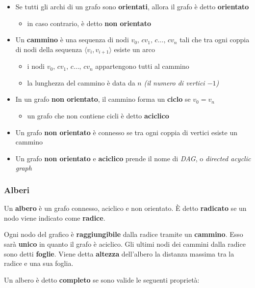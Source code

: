 \documentclass[italian, 10pt]{article}
\begin{document}
\begin{itemize}
  \item Se tutti gli archi di un grafo sono \textbf{orientati}, allora il grafo è detto \textbf{orientato}
        \begin{itemize}
          \item in caso contrario, è detto \textbf{non orientato}
        \end{itemize}
  \item Un \textbf{cammino} è una sequenza di nodi \(v_0,\,c v_1,\,c \ldots,\,c v_n\) tali che tra ogni coppia di nodi della sequenza \(\langle v_i, v_{i+1} \rangle\) esiste un arco
        \begin{itemize}
          \item i nodi \(v_0,\,c v_1,\,c \ldots,\,c v_n\) appartengono tutti al cammino
          \item la lunghezza del cammino è data da \(n\) \textit{(il numero di vertici \(-1\))}
        \end{itemize}
  \item In un grafo \textbf{non orientato}, il cammino forma un \textbf{ciclo} se \(v_0 = v_n\)
        \begin{itemize}
          \item un grafo che non contiene cicli è detto \textbf{aciclico}
        \end{itemize}
  \item Un grafo \textbf{non orientato} è connesso se tra ogni coppia di vertici esiste un cammino
  \item Un grafo \textbf{non orientato} e \textbf{aciclico} prende il nome di \textit{DAG}, o \textit{directed acyclic graph}
\end{itemize}

\subsubsection{Alberi}
\label{sec:alberi}

Un \textbf{albero} è un grafo connesso, aciclico e non orientato.
È detto \textbf{radicato} se un nodo viene indicato come \textbf{radice}.

Ogni nodo del grafico è \textbf{raggiungibile} dalla radice tramite un \textbf{cammino}.
Esso sarà \textbf{unico} in quanto il grafo è aciclico.
Gli ultimi nodi dei cammini dalla radice sono detti \textbf{foglie}.
Viene detta \textbf{altezza} dell'albero la distanza massima tra la radice e una sua foglia.

Un albero è detto \textbf{completo} se sono valide le seguenti proprietà:
\end{document}
